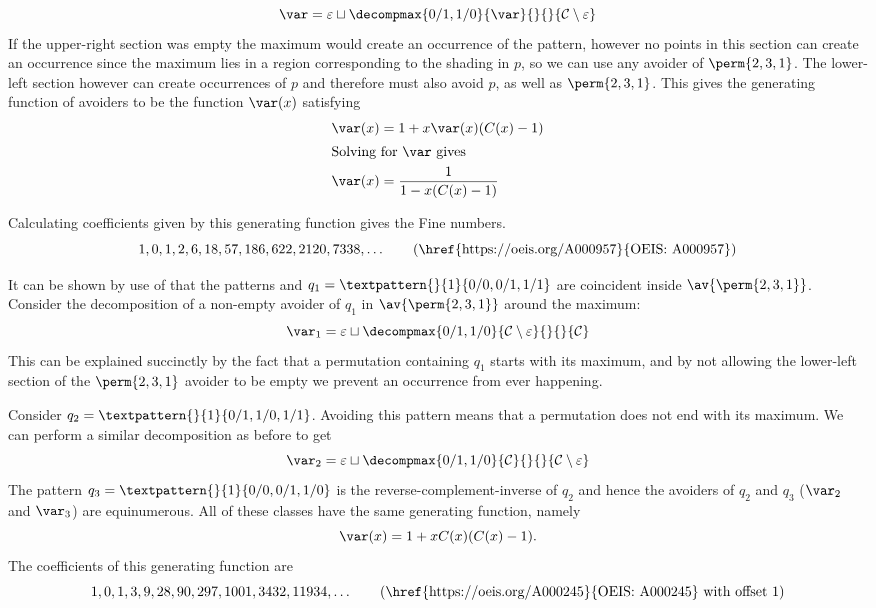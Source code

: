 \begin{equation*}
    \scriptvar = \varepsilon \sqcup
\decompmax{0/1,1/0}{\scriptvar}{}{}{\mathcal{C}\setminus\varepsilon}
\end{equation*}
If the upper-right section was empty the maximum would create an
occurrence of the pattern, however no points in this section can create
an occurrence since the maximum lies in a region corresponding to the
shading in \(p\), so we can use any avoider of \(\perm{2,3,1}\). The lower-left
section however can create occurrences
of \(p\) and therefore must also avoid \(p\), as well as \(\perm{2,3,1}\).
This gives the generating function of avoiders to be the function \(\var(x)\)
satisfying
\begin{align*}
    \var(x) &= 1 + x\var(x)(C(x)-1) \\
    \shortintertext{Solving for \(\var\) gives}
    \var(x) &= \frac{1}{1-x(C(x)-1)}
\end{align*}

\noindent
Calculating coefficients given by this generating function gives the Fine
numbers.
\begin{equation*}
    1, 0, 1, 2, 6, 18, 57, 186, 622, 2120, 7338,\dotsc
\tag{\href{https://oeis.org/A000957}{OEIS: A000957}}
\end{equation*}

\nextvar[\varfine]
It can be shown by use of  that the patterns
 and \(q_1 = \textpattern{}{1}{0/0,0/1,1/1}\) are
coincident inside \(\av{\perm{2,3,1}}\). Consider the decomposition of a non-empty avoider of \(q_1\) in
\(\av{\perm{2,3,1}}\) around the maximum:
\begin{equation*}
    \scriptvar_1 =\varepsilon \sqcup
\decompmax{0/1,1/0}{\mathcal{C}\setminus\varepsilon}{}{}{\mathcal{C}}
\end{equation*}
This can be explained succinctly by the fact that a permutation containing
\(q_1\) starts with its maximum, and by not allowing the lower-left section of the
\(\perm{2,3,1}\) avoider to be empty we prevent an occurrence from ever
happening.

Consider \(q_2 = \textpattern{}{1}{0/1,1/0,1/1}\). Avoiding this pattern
means that a permutation does not end with its maximum. We can perform a
similar
decomposition as before to get
\begin{equation*}
    \mathcal{\var}_2 =\varepsilon \sqcup
\decompmax{0/1,1/0}{\mathcal{C}}{}{}{\mathcal{C}\setminus\varepsilon}
\end{equation*}
The pattern \(q_3 = \textpattern{}{1}{0/0,0/1,1/0}\) is the reverse-complement-inverse
of \(q_2\) and hence the avoiders of \(q_2\) and \(q_3\) (\(\scriptvar_2\) and \(\scriptvar_3\)) are equinumerous.
All of these classes have the same generating function, namely
\begin{equation}
    \var(x) = 1 + xC(x)(C(x)-1). \label{eqn:maxlgen}
\end{equation}
The coefficients of this generating function are
\begin{equation*}
    1, 0, 1, 3, 9, 28, 90, 297, 1001, 3432, 11934,\dotsc
\tag{\href{https://oeis.org/A000245}{OEIS: A000245} with offset \(1\)}
\end{equation*}

